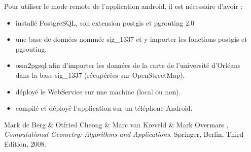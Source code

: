 \documentclass[12pt,a4paper,oneside]{article}
\begin{document}
Pour utiliser le mode remote de l'application android, il est nécessaire d'avoir :
\begin{itemize}
\item installé PostgreSQL, son extension postgis et pgrouting 2.0
\item une base de données nommée sig\_1337 et y importer les fonctions postgis et pgrouting.
\item osm2pgsql afin d'importer les données de la carte de l'université d'Orléans dans la base sig\_1337 (récupérées sur OpenStreetMap).
\item déployé le WebService sur une machine (local ou non).
\item compilé et déployé l'application sur un téléphone Android.
\end{itemize}

\newpage 

\begin{thebibliography}{9}

  Mark de Berg \& Otfried Cheong \& Marc van Kreveld \& Mark Overmars ,
  \emph{Computational Geometry: Algorithms and Applications}.
  Springer, Berlin,
  Third Edition,
  2008.

\end{thebibliography}
\appendix
\end{document}
